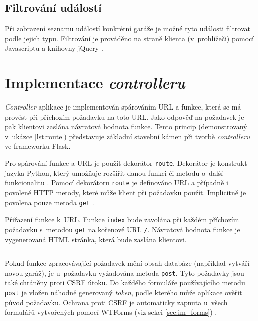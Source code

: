 \subsection{Filtrování událostí}

Při zobrazení seznamu událostí konkrétní garáže je možné tyto události filtrovat podle jejich typu. Filtrování je prováděno na straně klienta (v~prohlížeči) pomocí Javascriptu a knihovny jQuery \cite{jquery_about}.

\section{Implementace \textit{controlleru}}
\label{sec:im_controller}

\textit{Controller} aplikace je implementován spárováním URL a funkce, která se má provést při příchozím požadavku na toto URL. Jako odpověď na požadavek je pak klientovi zaslána návratová hodnota funkce. Tento princip (demonstrovaný v~ukázce \ref{lst:route}) představuje základní stavební kámen při tvorbě \textit{controlleru} ve frameworku Flask.

Pro spárování funkce a URL je použit dekorátor \texttt{route}. Dekorátor je konstrukt jazyka Python, který umožňuje rozšířit danou funkci či metodu o~další funkcionalitu \cite{python_decorators}. Pomocí dekorátoru \texttt{route} je definováno URL a případně i povolené HTTP metody, které může klient při požadavku použít. Implicitně je povolena pouze metoda \texttt{get} \cite{flask_api}. 

\begin{listing}[htbp]
\caption{\label{lst:route} Přiřazení funkce k~URL. Funkce \texttt{index} bude zavolána při každém příchozím požadavku s~metodou \texttt{get} na kořenové URL \texttt{/}. Návratová hodnota funkce je vygenerovaná HTML stránka, která bude zaslána klientovi.}
\inputminted[bgcolor=codebg]{python}{source-samples/route.py}
\end{listing}

Pokud funkce zpracovávající požadavek mění obsah databáze (například vytváří novou garáž), je u~požadavku vyžadována metoda \texttt{post}. Tyto požadavky jsou také chráněny proti CSRF útoku. Do každého formuláře používajícího metodu \texttt{post} je vložen náhodně generovaný \textit{token}, podle kterého může aplikace ověřit původ požadavku. Ochrana proti CSRF je automaticky zapnuta u~všech formulářů vytvořených pomocí WTForms (viz sekci \ref{sec:im_forms}) \cite{flask_wtf}.


